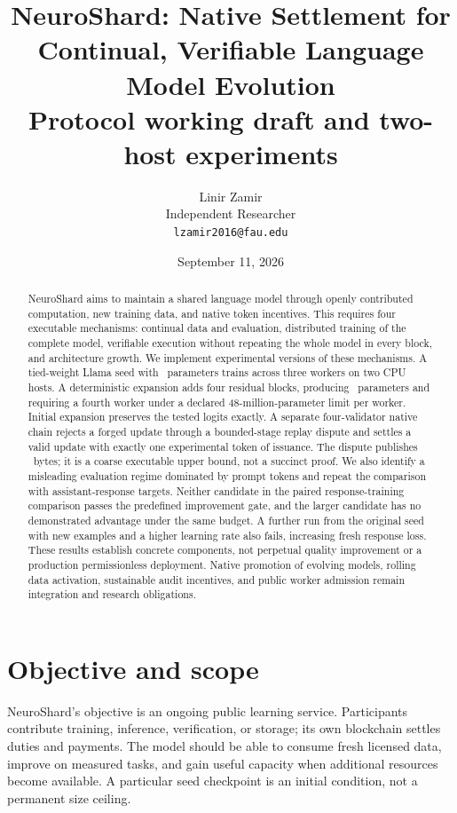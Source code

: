 \documentclass[11pt]{article}
\title{NeuroShard: Native Settlement for Continual, Verifiable Language Model Evolution\\\large Protocol working draft and two-host experiments}
\author{Linir Zamir\\Independent Researcher\\\texttt{lzamir2016@fau.edu}}
\date{September 11, 2026}
\begin{document}
\maketitle
\begin{abstract}
NeuroShard aims to maintain a shared language model through openly contributed computation, new training data, and native token incentives. This requires four executable mechanisms: continual data and evaluation, distributed training of the complete model, verifiable execution without repeating the whole model in every block, and architecture growth. We implement experimental versions of these mechanisms. A tied-weight Llama seed with \SeedParameters\ parameters trains across three workers on two CPU hosts. A deterministic expansion adds four residual blocks, producing \GrownParameters\ parameters and requiring a fourth worker under a declared 48-million-parameter limit per worker. Initial expansion preserves the tested logits exactly. A separate four-validator native chain rejects a forged update through a bounded-stage replay dispute and settles a valid update with exactly one experimental token of issuance. The dispute publishes \ReplayBytes\ bytes; it is a coarse executable upper bound, not a succinct proof. We also identify a misleading evaluation regime dominated by prompt tokens and repeat the comparison with assistant-response targets. Neither candidate in the paired response-training comparison passes the predefined improvement gate, and the larger candidate has no demonstrated advantage under the same budget. A further run from the original seed with new examples and a higher learning rate also fails, increasing fresh response loss. These results establish concrete components, not perpetual quality improvement or a production permissionless deployment. Native promotion of evolving models, rolling data activation, sustainable audit incentives, and public worker admission remain integration and research obligations.
\end{abstract}

\section{Objective and scope}
NeuroShard's objective is an ongoing public learning service. Participants contribute training, inference, verification, or storage; its own blockchain settles duties and payments. The model should be able to consume fresh licensed data, improve on measured tasks, and gain useful capacity when additional resources become available. A particular seed checkpoint is an initial condition, not a permanent size ceiling.
\end{document}
